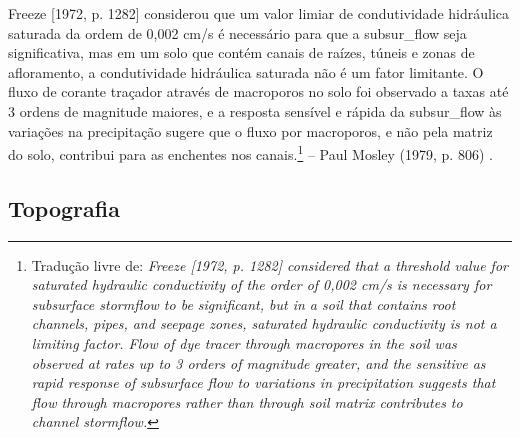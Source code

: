 \documentclass[./main.tex]{subfiles}
\begin{document}
\begin{adjustwidth}{100pt}{0pt}
\medskip
\small Freeze [1972, p. 1282] considerou que um valor limiar de condutividade hidráulica saturada da ordem de 0,002 cm/s é necessário para que a \gls{subsur_flow} seja significativa, mas em um solo que contém canais de raízes, túneis e zonas de afloramento, a condutividade hidráulica saturada não é um fator limitante. O fluxo de corante traçador através de macroporos no solo foi observado a taxas até 3 ordens de magnitude maiores, e a resposta sensível e rápida da \gls{subsur_flow} às variações na precipitação sugere que o fluxo por macroporos, e não pela matriz do solo, contribui para as enchentes nos canais.\footnote{Tradução livre de: \textit{Freeze [1972, p. 1282] considered that a threshold value for saturated hydraulic conductivity of the order of 0,002 cm/s is necessary for subsurface stormflow to be significant, but in a soil that contains root channels, pipes, and seepage zones, saturated hydraulic conductivity is not a limiting factor. Flow of dye tracer through macropores in the soil was observed at rates up to 3 orders of magnitude greater, and the sensitive as rapid response of subsurface flow to variations in precipitation suggests that flow through macropores rather than through soil matrix contributes to channel stormflow.}} -- Paul Mosley (1979, p. 806) \cite{Mosley1979}.
\medskip
\end{adjustwidth}

\subsection{Topografia}
\end{document}
